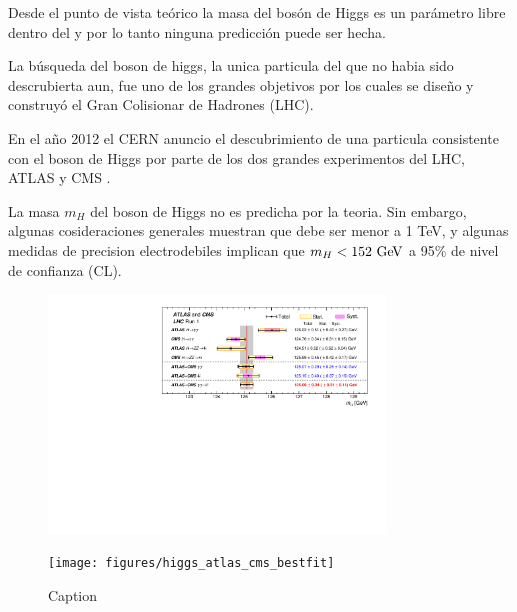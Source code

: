 Desde el punto de vista teórico la masa del bosón de Higgs es un parámetro
libre dentro del {\SM} y por lo tanto ninguna predicción puede ser hecha.

La b\'usqueda del boson de higgs, la unica particula del {\SM} que
no habia sido descrubierta aun, fue uno de los grandes objetivos por los
cuales se dise\~no y construyó el Gran Colisionar de Hadrones (LHC).


En el a\~no 2012 el CERN anuncio el descubrimiento de una particula
consistente con el boson de Higgs por parte de los dos grandes
experimentos del LHC, ATLAS y CMS \cite{Aad:2012tfa,Chatrchyan:2012ufa}.

La masa $m_H$ del boson de Higgs no es predicha por la teoria. Sin embargo,
algunas cosideraciones generales muestran que debe ser menor a 1 TeV, y
algunas medidas de precision electrodebiles implican que $m_H < 152 \gev$ a
95\% de nivel de confianza (CL).

\begin{figure}[!ht]
  \centering
  \includegraphics[width=0.8\textwidth]{figures/higgs_atlas_cms_mass}

  \texttt{[image: figures/higgs\_atlas\_cms\_bestfit]}
  \caption{Caption}
  \label{fig:higgs_cms_atlas}
\end{figure}


